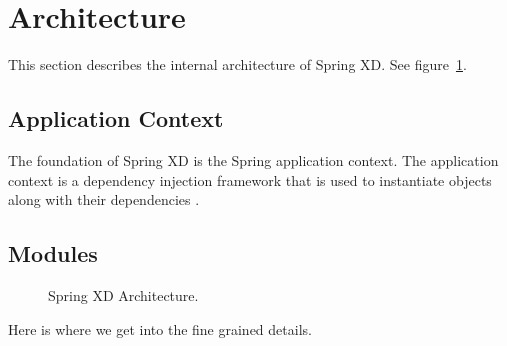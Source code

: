 \section{Architecture}
This section describes the internal architecture of Spring XD. See figure~\ref{fig:architecture}.

\subsection{Application Context}
The foundation of Spring XD is the Spring application context. The application context is a dependency injection framework that is used to instantiate objects along with their dependencies \cite{spring-framework-reference}. 

\subsection{Modules}


\begin{figure}[ht]
\centering
{}
\caption{Spring XD Architecture.}
\label{fig:architecture}
\end{figure}

Here is where we get into the fine grained details.